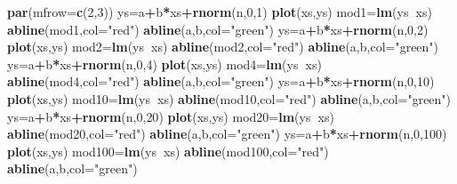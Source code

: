 \documentclass[
]{book}
\newenvironment{Shaded}{\begin{snugshade}}{\end{snugshade}}
\newcommand{\DataTypeTok}[1]{\textcolor[rgb]{0.13,0.29,0.53}{#1}}
\newcommand{\DecValTok}[1]{\textcolor[rgb]{0.00,0.00,0.81}{#1}}
\newcommand{\KeywordTok}[1]{\textcolor[rgb]{0.13,0.29,0.53}{\textbf{#1}}}
\newcommand{\NormalTok}[1]{#1}
\newcommand{\OperatorTok}[1]{\textcolor[rgb]{0.81,0.36,0.00}{\textbf{#1}}}
\newcommand{\StringTok}[1]{\textcolor[rgb]{0.31,0.60,0.02}{#1}}
\begin{document}
\begin{Shaded}
\begin{Highlighting}[]
\KeywordTok{par}\NormalTok{(}\DataTypeTok{mfrow=}\KeywordTok{c}\NormalTok{(}\DecValTok{2}\NormalTok{,}\DecValTok{3}\NormalTok{))}
\NormalTok{ys=a}\OperatorTok{+}\NormalTok{b}\OperatorTok{*}\NormalTok{xs}\OperatorTok{+}\KeywordTok{rnorm}\NormalTok{(n,}\DecValTok{0}\NormalTok{,}\DecValTok{1}\NormalTok{)}
\KeywordTok{plot}\NormalTok{(xs,ys)}
\NormalTok{mod1=}\KeywordTok{lm}\NormalTok{(ys}\OperatorTok{~}\NormalTok{xs)}
\KeywordTok{abline}\NormalTok{(mod1,}\DataTypeTok{col=}\StringTok{"red"}\NormalTok{)}
\KeywordTok{abline}\NormalTok{(a,b,}\DataTypeTok{col=}\StringTok{"green"}\NormalTok{)}
\NormalTok{ys=a}\OperatorTok{+}\NormalTok{b}\OperatorTok{*}\NormalTok{xs}\OperatorTok{+}\KeywordTok{rnorm}\NormalTok{(n,}\DecValTok{0}\NormalTok{,}\DecValTok{2}\NormalTok{)}
\KeywordTok{plot}\NormalTok{(xs,ys)}
\NormalTok{mod2=}\KeywordTok{lm}\NormalTok{(ys}\OperatorTok{~}\NormalTok{xs)}
\KeywordTok{abline}\NormalTok{(mod2,}\DataTypeTok{col=}\StringTok{"red"}\NormalTok{)}
\KeywordTok{abline}\NormalTok{(a,b,}\DataTypeTok{col=}\StringTok{"green"}\NormalTok{)}
\NormalTok{ys=a}\OperatorTok{+}\NormalTok{b}\OperatorTok{*}\NormalTok{xs}\OperatorTok{+}\KeywordTok{rnorm}\NormalTok{(n,}\DecValTok{0}\NormalTok{,}\DecValTok{4}\NormalTok{)}
\KeywordTok{plot}\NormalTok{(xs,ys)}
\NormalTok{mod4=}\KeywordTok{lm}\NormalTok{(ys}\OperatorTok{~}\NormalTok{xs)}
\KeywordTok{abline}\NormalTok{(mod4,}\DataTypeTok{col=}\StringTok{"red"}\NormalTok{)}
\KeywordTok{abline}\NormalTok{(a,b,}\DataTypeTok{col=}\StringTok{"green"}\NormalTok{)}
\NormalTok{ys=a}\OperatorTok{+}\NormalTok{b}\OperatorTok{*}\NormalTok{xs}\OperatorTok{+}\KeywordTok{rnorm}\NormalTok{(n,}\DecValTok{0}\NormalTok{,}\DecValTok{10}\NormalTok{)}
\KeywordTok{plot}\NormalTok{(xs,ys)}
\NormalTok{mod10=}\KeywordTok{lm}\NormalTok{(ys}\OperatorTok{~}\NormalTok{xs)}
\KeywordTok{abline}\NormalTok{(mod10,}\DataTypeTok{col=}\StringTok{"red"}\NormalTok{)}
\KeywordTok{abline}\NormalTok{(a,b,}\DataTypeTok{col=}\StringTok{"green"}\NormalTok{)}
\NormalTok{ys=a}\OperatorTok{+}\NormalTok{b}\OperatorTok{*}\NormalTok{xs}\OperatorTok{+}\KeywordTok{rnorm}\NormalTok{(n,}\DecValTok{0}\NormalTok{,}\DecValTok{20}\NormalTok{)}
\KeywordTok{plot}\NormalTok{(xs,ys)}
\NormalTok{mod20=}\KeywordTok{lm}\NormalTok{(ys}\OperatorTok{~}\NormalTok{xs)}
\KeywordTok{abline}\NormalTok{(mod20,}\DataTypeTok{col=}\StringTok{"red"}\NormalTok{)}
\KeywordTok{abline}\NormalTok{(a,b,}\DataTypeTok{col=}\StringTok{"green"}\NormalTok{)}
\NormalTok{ys=a}\OperatorTok{+}\NormalTok{b}\OperatorTok{*}\NormalTok{xs}\OperatorTok{+}\KeywordTok{rnorm}\NormalTok{(n,}\DecValTok{0}\NormalTok{,}\DecValTok{100}\NormalTok{)}
\KeywordTok{plot}\NormalTok{(xs,ys)}
\NormalTok{mod100=}\KeywordTok{lm}\NormalTok{(ys}\OperatorTok{~}\NormalTok{xs)}
\KeywordTok{abline}\NormalTok{(mod100,}\DataTypeTok{col=}\StringTok{"red"}\NormalTok{)}
\KeywordTok{abline}\NormalTok{(a,b,}\DataTypeTok{col=}\StringTok{"green"}\NormalTok{)}
\end{Highlighting}
\end{Shaded}
\end{document}
